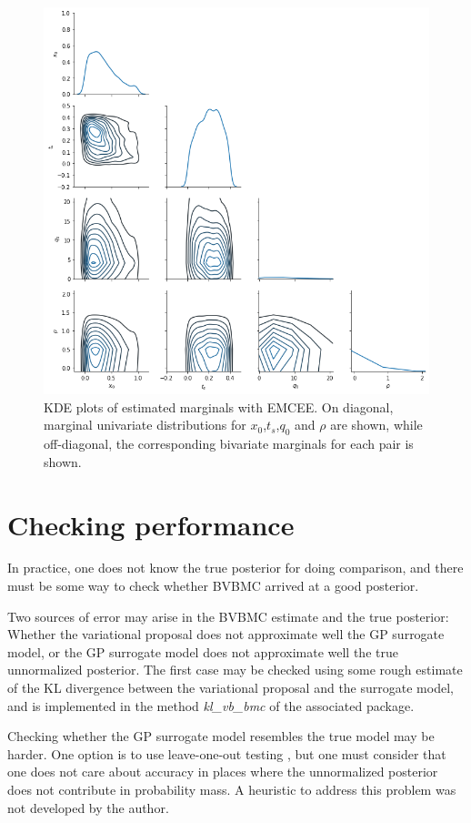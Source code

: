 \begin{figure}
	\centering
	\includegraphics[width=0.8\linewidth]{figs/sourceproblemhistogramsemcee.png}
	\caption[KDE plots of estimated marginals with EMCEE. On diagonal.]{KDE plots of estimated marginals with EMCEE. On diagonal, marginal univariate distributions for $x_0$,$t_s$,$q_0$ and $\rho$ are shown, while off-diagonal, the corresponding bivariate marginals for each pair is shown.}
	\label{sourceemceehistogram} 
\end{figure}

\section{Checking performance}
In practice, one does not know the true posterior for doing comparison, and there must be some way to check whether BVBMC arrived at a good posterior.

Two sources of error may arise in the BVBMC estimate and the true posterior: Whether the variational proposal does not approximate well the GP surrogate model, or the GP surrogate model does not approximate well the true  unnormalized posterior. The first case may be checked using some rough estimate of the KL divergence between the variational proposal and the surrogate model, and is implemented in the method \textit{kl\_vb\_bmc} of the associated package. 

Checking whether the GP surrogate model resembles the true model may be harder. One option is to use leave-one-out testing \cite{Rasmussen06}, but one must consider that one does not care about accuracy in places where the unnormalized posterior does not contribute in probability mass. A heuristic to address this problem was not developed by the author.



